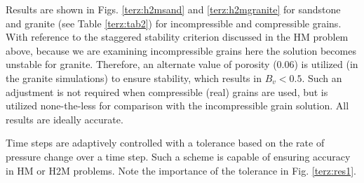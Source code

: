 Results are shown in Figs. \ref{terz:h2msand} and \ref{terz:h2mgranite} for sandstone and granite (see Table \ref{terz:tab2}) for incompressible and compressible grains. With reference to the staggered stability criterion discussed in the HM problem above, because we are examining incompressible grains here the solution becomes unstable for granite. Therefore, an alternate value of porosity (0.06) is utilized (in the granite simulations) to ensure stability, which results in $B_v<0.5$. Such an adjustment is not required when compressible (real) grains are used, but is utilized none-the-less for comparison with the incompressible grain solution. All results are ideally accurate. 

Time steps are adaptively controlled with a tolerance based on the rate of pressure change over a time step. Such a scheme is capable of ensuring accuracy in HM or H2M problems. Note the importance of the tolerance in Fig. \ref{terz:res1}.
